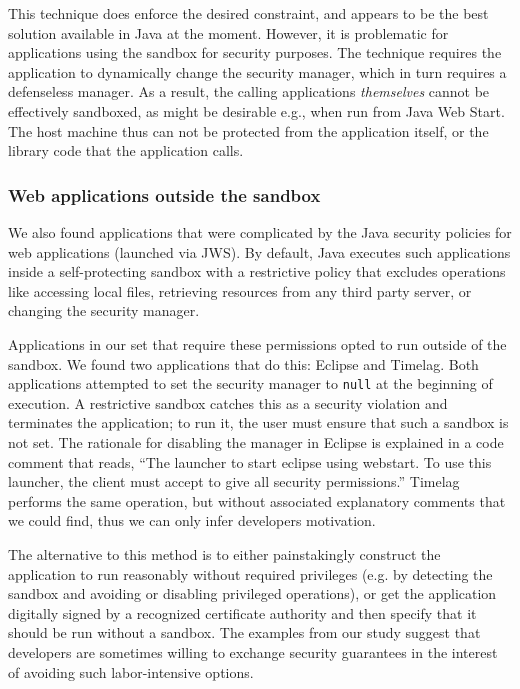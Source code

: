\documentclass{sig-alternate}
\begin{document}
This technique does enforce the
desired constraint, and appears to be the best solution available
in Java at the moment.  However, it is problematic for applications using the
sandbox for security purposes.  The technique requires 
the application to dynamically change the security manager, which in turn requires a
defenseless manager.  As a result, the calling applications \emph{themselves} cannot be
effectively sandboxed, as might be desirable e.g., when run from Java Web Start.
The host machine thus can not be protected from the application itself, or the
library code that the application calls. 

\subsubsection{Web applications outside the sandbox}\label{sub:Reducing-Web-Application-Complexity}

We also found applications that were complicated by the Java security policies
for web applications (launched via JWS). By default,
Java executes such applications inside a self-protecting 
sandbox with a restrictive policy that excludes
operations like accessing local files, retrieving resources
from any third party server, or changing the security manager. 

Applications in our set that require these permissions
opted to run outside of the sandbox.  
We found two applications that do this: Eclipse and
Timelag.  Both applications attempted
to set the security manager to \texttt{null} at the beginning of execution.
A restrictive sandbox catches this as a security violation and terminates the
application; to run it, the user must ensure that such a sandbox is not set.
The rationale for disabling the manager in Eclipse is explained in a 
code comment that reads, ``The launcher to start eclipse using webstart. To use
this launcher, the client must accept to give all security permissions.'' Timelag
performs the same operation, but without associated explanatory comments that we
could find, thus we can only 
infer developers motivation. 

The alternative to this method is to either painstakingly
construct the application to run reasonably without required privileges (e.g. by
detecting the sandbox and avoiding or disabling privileged operations), or get
the application digitally signed by a recognized certificate authority and
then specify that it should be run without a sandbox.  The examples from our study suggest that
developers are sometimes willing to exchange security guarantees in the interest
of avoiding such labor-intensive options.
\end{document}
